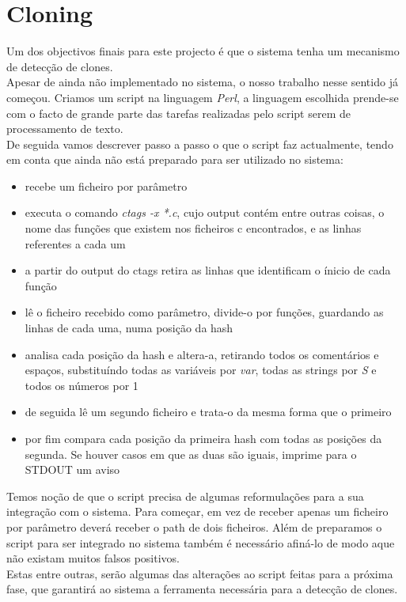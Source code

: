 \section{Cloning}
Um dos objectivos finais para este projecto é que o sistema tenha um mecanismo de detecção de clones.\\
Apesar de ainda não implementado no sistema, o nosso trabalho nesse sentido já começou. Criamos um script na linguagem \textit{Perl},
a linguagem escolhida prende-se com o facto de grande parte das tarefas realizadas pelo script serem de processamento de texto.\\
De seguida vamos descrever passo a passo o que o script faz actualmente, tendo em conta que ainda não está preparado para ser
utilizado no sistema:\\
\begin{itemize}
\item recebe um ficheiro por parâmetro
\item executa o comando \textit{ctags -x *.c}, cujo output contém entre outras coisas, o nome das funções que existem nos ficheiros c
encontrados, e as linhas referentes a cada um
\item a partir do output do ctags retira as linhas que identificam o ínicio de cada função
\item lê o ficheiro recebido como parâmetro, divide-o por funções, guardando as linhas de cada uma, numa posição da hash
\item analisa cada posição da hash e altera-a, retirando todos os comentários e espaços, substituíndo todas as variáveis por \textit{var},
todas as strings por \textit{S} e todos os números por 1
\item de seguida lê um segundo ficheiro e trata-o da mesma forma que o primeiro
\item por fim compara cada posição da primeira hash com todas as posições da segunda. Se houver casos em que as duas são iguais,
imprime para o STDOUT um aviso
\end{itemize}

Temos noção de que o script precisa de algumas reformulações para a sua integração com o sistema. Para começar, em vez de receber
apenas um ficheiro por parâmetro deverá receber o path de dois ficheiros. Além de preparamos o script para ser integrado no sistema 
também é necessário afiná-lo de modo aque não existam muitos falsos positivos.\\
Estas entre outras, serão algumas das alterações ao script feitas para a próxima fase, que garantirá ao sistema a ferramenta necessária
para a detecção de clones.








